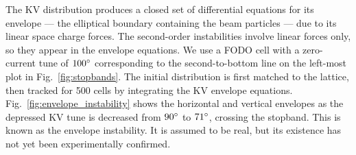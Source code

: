 The KV distribution produces a closed set of differential equations for its envelope — the elliptical boundary containing the beam particles — due to its linear space charge forces. The second-order instabilities involve linear forces only, so they appear in the envelope equations. We use a FODO cell with a zero-current tune of $100\degree$ corresponding to the second-to-bottom line on the left-most plot in Fig.~\ref{fig:stopbands}. The initial distribution is first matched to the lattice, then tracked for 500 cells by integrating the KV envelope equations. Fig.~\ref{fig:envelope_instability} shows the horizontal and vertical envelopes as the depressed KV tune is decreased from $90\degree$ to $71\degree$, crossing the stopband. This is known as the envelope instability. It is assumed to be real, but its existence has not yet been experimentally confirmed.

